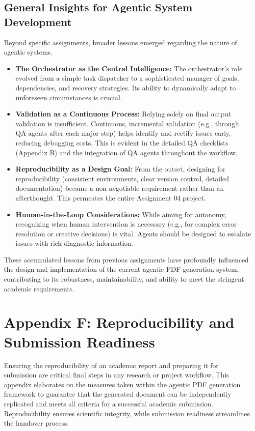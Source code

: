 \documentclass{custom-academic-template}
\begin{document}
\subsection{General Insights for Agentic System Development}
Beyond specific assignments, broader lessons emerged regarding the nature of agentic systems.
\begin{itemize}
    \item \textbf{The Orchestrator as the Central Intelligence:} The orchestrator's role evolved from a simple task dispatcher to a sophisticated manager of goals, dependencies, and recovery strategies. Its ability to dynamically adapt to unforeseen circumstances is crucial.
    \item \textbf{Validation as a Continuous Process:} Relying solely on final output validation is insufficient. Continuous, incremental validation (e.g., through QA agents after each major step) helps identify and rectify issues early, reducing debugging costs. This is evident in the detailed QA checklists (Appendix B) and the integration of QA agents throughout the workflow.
    \item \textbf{Reproducibility as a Design Goal:} From the outset, designing for reproducibility (consistent environments, clear version control, detailed documentation) became a non-negotiable requirement rather than an afterthought. This permeates the entire Assignment 04 project.
    \item \textbf{Human-in-the-Loop Considerations:} While aiming for autonomy, recognizing when human intervention is necessary (e.g., for complex error resolution or creative decisions) is vital. Agents should be designed to escalate issues with rich diagnostic information.
\end{itemize}
These accumulated lessons from previous assignments have profoundly influenced the design and implementation of the current agentic PDF generation system, contributing to its robustness, maintainability, and ability to meet the stringent academic requirements.

\section{Appendix F: Reproducibility and Submission Readiness}
Ensuring the reproducibility of an academic report and preparing it for submission are critical final steps in any research or project workflow. This appendix elaborates on the measures taken within the agentic PDF generation framework to guarantee that the generated document can be independently replicated and meets all criteria for a successful academic submission. Reproducibility ensures scientific integrity, while submission readiness streamlines the handover process.
\end{document}

